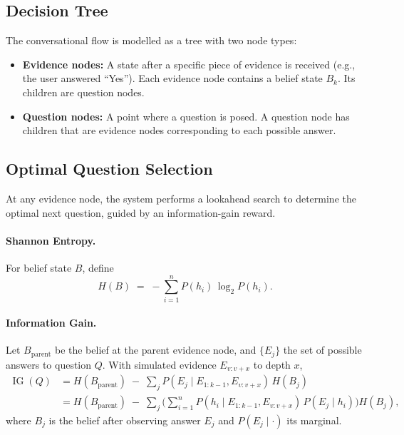 \documentclass{article} %
\begin{document}
\subsection{Decision Tree}
The conversational flow is modelled as a tree with two node types:
\begin{itemize}
  \item \textbf{Evidence nodes:} A state after a specific piece of evidence is received (e.g., the user answered ``Yes''). Each evidence node contains a belief state $B_k$. Its children are question nodes.
  \item \textbf{Question nodes:} A point where a question is posed. A question node has children that are evidence nodes corresponding to each possible answer.
\end{itemize}

\subsection{Optimal Question Selection}
At any evidence node, the system performs a lookahead search to determine the optimal next question, guided by an information-gain reward.

\paragraph{Shannon Entropy.}
For belief state $B$, define
\[
H(B)\;=\; -\sum_{i=1}^{n} P(h_i)\,\log_2 P(h_i).
\]

\paragraph{Information Gain.}
Let $B_{\text{parent}}$ be the belief at the parent evidence node, and $\{E_j\}$ the set of possible answers to question $Q$. With simulated evidence $E_{v:v+x}$ to depth $x$,
\begin{align*}
\operatorname{IG}(Q)
&= H(B_{\text{parent}})\;-\;\sum_{j} P\!\left(E_j \mid E_{1:k-1},E_{v:v+x}\right)\, H(B_j) \\
&= H(B_{\text{parent}})\;-\;\sum_{j}\Bigg(\sum_{i=1}^{n} P\!\left(h_i \mid E_{1:k-1},E_{v:v+x}\right)\, P\!\left(E_j \mid h_i\right)\Bigg) H(B_j),
\end{align*}
where $B_j$ is the belief after observing answer $E_j$ and $P(E_j\mid\cdot)$ its marginal. 
\end{document}
